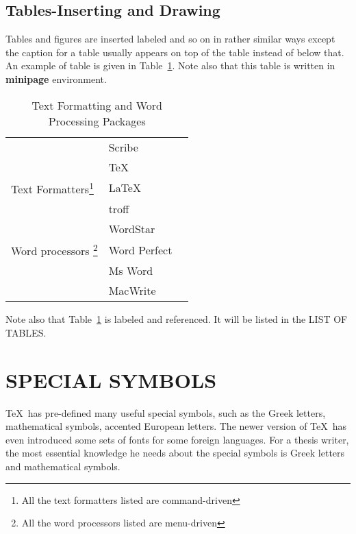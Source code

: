 \section{Tables-Inserting and Drawing}
Tables and figures are inserted labeled and so on in rather similar ways
except the caption for a table usually appears on top of the table instead
of below that. An example of table is given in Table~\ref{tab:1}. Note
also that this table is written in \textbf{minipage} environment.

\begin{table}
\begin{minipage}[t]{6in}
\caption{Text Formatting and Word Processing Packages}\label{tab:1}
\begin{center}
\begin{tabular}{|l|l|l|}  \hline
	    & Scribe \\ \cline{2-2}
	    & \TeX   \\ \cline{2-2}
Text Formatters\footnote{All the text formatters listed are command-driven}%
	    & \LaTeX \\ \cline{2-2}
	    & troff  \\ \hline
	    & WordStar \\ \cline{2-2}
Word processors \footnote{All the word processors listed are menu-driven}%
	    & Word Perfect  \\ \cline{2-2}
	    & Ms Word	\\ \cline{2-2}
	    & MacWrite	\\ \hline
\end{tabular}
\end{center}
\end{minipage}
\end{table}
Note also that Table~\ref{tab:1} is labeled and referenced. It will be
listed in the LIST OF TABLES.


\chapter{SPECIAL SYMBOLS}

\TeX\ has pre-defined many useful special symbols, such as the Greek
letters, mathematical symbols, accented European letters. The newer
version of \TeX\ has even introduced some sets of fonts for some foreign
languages.
For a thesis writer, the most essential knowledge he needs about the
special symbols is Greek letters and mathematical symbols.

